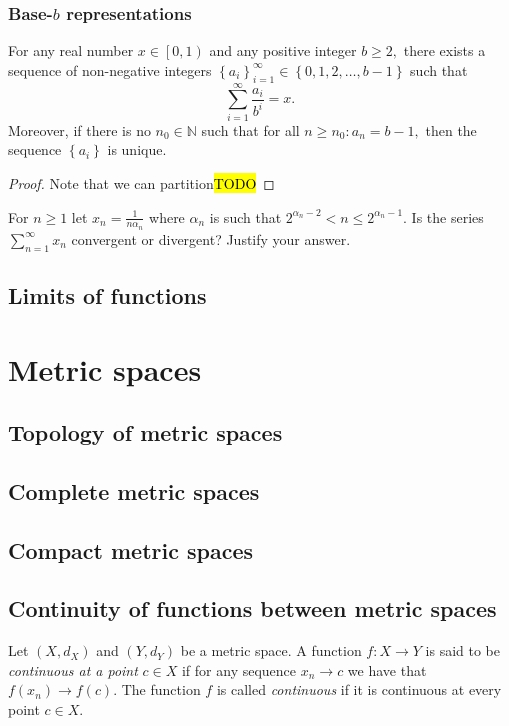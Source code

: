 \subsubsection{\label{subsec:baseBRepresentations}Base-$b$ representations}
\begin{thm}
\label{thm:realDecimalExpansion}For any real number $x\in\left[0,1\right)$
and any positive integer $b\geq2,$ there exists a sequence of non-negative
integers $\left\{ a_{i}\right\} _{i=1}^{\infty}\in\left\{ 0,1,2,\ldots,b-1\right\} $
such that 
\[
\sum_{i=1}^{\infty}\frac{a_{i}}{b^{i}}=x.
\]
Moreover, if there is no $n_{0}\in\mathbb{N}$ such that for all $n\geq n_{0}:a_{n}=b-1,$
then the sequence $\left\{ a_{i}\right\} $ is unique.
\end{thm}

\begin{proof}
Note that we can partition\hl{TODO}
\end{proof}
\begin{example}
\label{exa:isi2004samplepsb11}For $n\geq1$ let $x_{n}=\frac{1}{n\alpha_{n}}$
where $\alpha_{n}$ is such that $2^{\alpha_{n}-2}<n\leq2^{\alpha_{n}-1}$.
Is the series $\sum_{n=1}^{\infty}x_{n}$ convergent or divergent?
Justify your answer.
\end{example}


\subsection{Limits of functions}


\section{Metric spaces}

\subsection{Topology of metric spaces}

\subsection{Complete metric spaces}

\subsection{Compact metric spaces}

\subsection{Continuity of functions between metric spaces}
\begin{defn}
\label{def:continousFunction}Let $\left(X,d_{X}\right)$ and $\left(Y,d_{Y}\right)$
be a metric space. A function $f:X\to Y$ is said to be \emph{continuous
at a point} $c\in X$ if for any sequence $x_{n}\to c$ we have that
$f\left(x_{n}\right)\to f\left(c\right)$. The function $f$ is called
\emph{continuous }if it is continuous at every point $c\in X$.
\end{defn}

